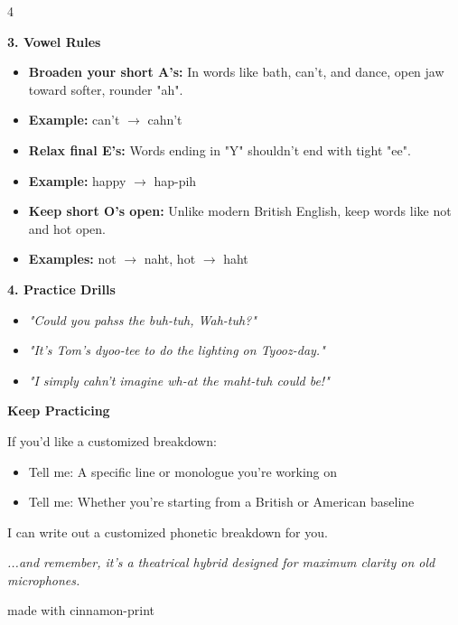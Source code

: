 \documentclass[12pt, a4paper]{article}
\begin{document}
\begin{multicols}{4}
\begin{minipage}{\columnwidth}
\textbf{3. Vowel Rules}

\begin{itemize}
    \item \textbf{Broaden your short A's:} In words like bath, can't, and dance, open jaw toward softer, rounder "ah".
    \item \textbf{Example:} can't $\rightarrow$ cahn't
    \item \textbf{Relax final E's:} Words ending in "Y" shouldn't end with tight "ee".
    \item \textbf{Example:} happy $\rightarrow$ hap-pih
    \item \textbf{Keep short O's open:} Unlike modern British English, keep words like not and hot open.
    \item \textbf{Examples:} not $\rightarrow$ naht, hot $\rightarrow$ haht
\end{itemize}

\vspace{0.5cm}

\textbf{4. Practice Drills}

\begin{itemize}
    \item \textit{"Could you pahss the buh-tuh, Wah-tuh?"}
    \item \textit{"It's Tom's dyoo-tee to do the lighting on Tyooz-day."}
    \item \textit{"I simply cahn't imagine wh-at the maht-tuh could be!"}
\end{itemize}

\end{minipage}

\begin{minipage}{\columnwidth}
\vspace{0.5cm}

\textbf{\large Keep Practicing}

If you'd like a customized breakdown:

\begin{itemize}
    \item Tell me: A specific line or monologue you're working on
    \item Tell me: Whether you're starting from a British or American baseline
\end{itemize}

I can write out a customized phonetic breakdown for you.

\begin{center}
\textit{...and remember, it's a theatrical hybrid designed for maximum clarity on old microphones.}
\end{center}
\end{minipage}

\end{multicols}

\vspace{0.5cm}
{ made with cinnamon-print}
\end{document}
